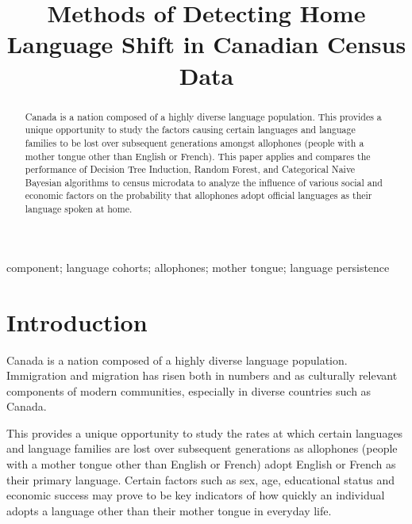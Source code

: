 \documentclass[10pt, conference, compsocconf]{IEEEtran}
\begin{document}
\title{Methods of Detecting Home Language Shift in Canadian Census Data}

\author{
}

\maketitle


\begin{abstract}
Canada is a nation composed of a highly diverse language population. This provides a unique opportunity to study the factors causing certain languages and language families to be lost over subsequent generations amongst allophones (people with a mother tongue other than English or French). This paper applies and compares the performance of Decision Tree Induction, Random Forest, and Categorical Naive Bayesian algorithms to census microdata to analyze the influence of various social and economic factors on the probability that allophones adopt official languages as their language spoken at home.

\end{abstract}

\begin{IEEEkeywords}
component; language cohorts; allophones; mother tongue; language persistence

\end{IEEEkeywords}


\IEEEpeerreviewmaketitle



\section{Introduction}
Canada is a nation composed of a highly diverse language population. Immigration and migration has risen both in numbers and as culturally relevant components of modern communities, especially in diverse countries such as Canada.

This provides a unique opportunity to study the rates at which certain languages and language families are lost over subsequent generations as allophones (people with a mother tongue other than English or French) adopt English or French as their primary language. Certain factors such as sex, age, educational status and economic success may prove to be key indicators of how quickly an individual adopts a language other than their mother tongue in everyday life.
\end{document}
